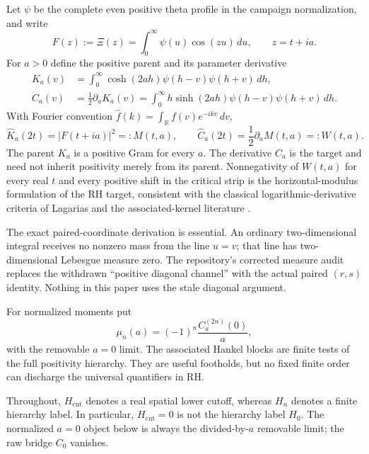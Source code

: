 \documentclass[11pt]{article}
\theoremstyle{definition}
\theoremstyle{remark}
\newcommand{\R}{\mathbb{R}}
\begin{document}
Let $\psi$ be the complete even positive theta profile in the campaign
normalization, and write
\begin{equation}
  F(z):=\Xi(z)=\int_0^\infty \psi(u)\cos(zu)\,du,
  \qquad z=t+ia.
\end{equation}
For $a>0$ define the positive parent and its parameter derivative
\begin{align}
 K_a(v)&=\int_0^\infty \cosh(2ah)\psi(h-v)\psi(h+v)\,dh,\\
 C_a(v)&=\frac12\partial_a K_a(v)
       =\int_0^\infty h\sinh(2ah)\psi(h-v)\psi(h+v)\,dh.
\end{align}
With Fourier convention $\widehat f(k)=\int_\R f(v)e^{-ikv}\,dv$,
\begin{equation}
 \widehat K_a(2t)=|F(t+ia)|^2=:M(t,a),\qquad
 \widehat C_a(2t)=\frac12\partial_a M(t,a)=:W(t,a).
 \label{eq:bridge-fourier}
\end{equation}
The parent $K_a$ is a positive Gram for every $a$. The derivative $C_a$ is the
target and need not inherit positivity merely from its parent. Nonnegativity of
$W(t,a)$ for every real $t$ and every positive shift in the critical strip is
the horizontal-modulus formulation of the RH target, consistent with the
classical logarithmic-derivative criteria of Lagarias and the associated-kernel
literature \cite{Lagarias1999,Lagarias2005,SondowDumitrescu2010,Csordas2015}.

The exact paired-coordinate derivation is essential. An ordinary
two-dimensional integral receives no nonzero mass from the line $u=v$; that
line has two-dimensional Lebesgue measure zero. The repository's corrected
measure audit replaces the withdrawn ``positive diagonal channel'' with the
actual paired $(r,s)$ identity. Nothing in this paper uses the stale diagonal
argument.

For normalized moments put
\begin{equation}
 \mu_n(a)=(-1)^n\frac{C_a^{(2n)}(0)}{a},
\end{equation}
with the removable $a=0$ limit. The associated Hankel blocks are finite tests
of the full positivity hierarchy. They are useful footholds, but no fixed
finite order can discharge the universal quantifiers in RH.

Throughout, $H_{\mathrm{cut}}$ denotes a real spatial lower cutoff, whereas
$H_n$ denotes a finite hierarchy label. In particular,
$H_{\mathrm{cut}}=0$ is not the hierarchy label $H_0$. The normalized
$a=0$ object below is always the divided-by-$a$ removable limit; the raw bridge
$C_0$ vanishes.
\end{document}
